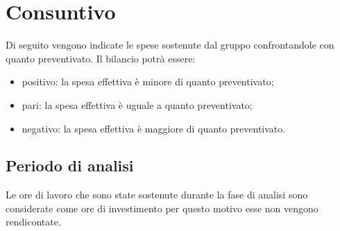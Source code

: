 \chapter{Consuntivo}\label{Consuntivo}
Di seguito vengono indicate le spese sostenute dal gruppo confrontandole con quanto preventivato. Il bilancio potrà essere:
\begin{itemize}
	\item positivo: la spesa effettiva è minore di quanto preventivato;
	\item pari: la spesa effettiva è uguale a quanto preventivato;
	\item negativo: la spesa effettiva è maggiore di quanto preventivato.
\end{itemize}
\section{Periodo di analisi}\label{ConsuntivoPeriodoDiAnalisi}
Le ore di lavoro che sono state sostenute durante la fase di analisi sono considerate come ore di investimento per questo motivo esse non vengono rendicontate.
\quad
\def\tabularxcolumn#1{m{#1}}
